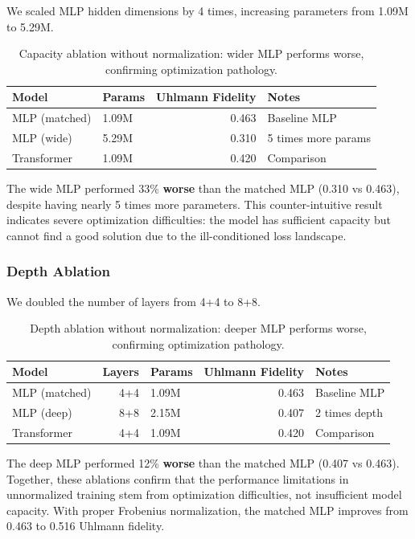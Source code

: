 \documentclass[11pt]{article}
\begin{document}
We scaled MLP hidden dimensions by 4 times, increasing parameters from 1.09M to 5.29M.

\begin{table}[htbp]
\caption{\label{tab:orgd8650ad}Capacity ablation without normalization: wider MLP performs worse, confirming optimization pathology.}
\centering
\begin{tabular}{llrl}
Model & Params & Uhlmann Fidelity & Notes\\
\hline
MLP (matched) & 1.09M & 0.463 & Baseline MLP\\
MLP (wide) & 5.29M & 0.310 & 5 times more params\\
Transformer & 1.09M & 0.420 & Comparison\\
\end{tabular}
\end{table}

The wide MLP performed 33\% \textbf{worse} than the matched MLP (0.310 vs 0.463), despite having nearly 5 times more parameters. This counter-intuitive result indicates severe optimization difficulties: the model has sufficient capacity but cannot find a good solution due to the ill-conditioned loss landscape.
\subsubsection{Depth Ablation}
\label{sec:org9bb49a6}

We doubled the number of layers from 4+4 to 8+8.

\begin{table}[htbp]
\caption{\label{tab:orgc1be02e}Depth ablation without normalization: deeper MLP performs worse, confirming optimization pathology.}
\centering
\begin{tabular}{lrlrl}
Model & Layers & Params & Uhlmann Fidelity & Notes\\
\hline
MLP (matched) & 4+4 & 1.09M & 0.463 & Baseline MLP\\
MLP (deep) & 8+8 & 2.15M & 0.407 & 2 times depth\\
Transformer & 4+4 & 1.09M & 0.420 & Comparison\\
\end{tabular}
\end{table}

The deep MLP performed 12\% \textbf{worse} than the matched MLP (0.407 vs 0.463). Together, these ablations confirm that the performance limitations in unnormalized training stem from optimization difficulties, not insufficient model capacity. With proper Frobenius normalization, the matched MLP improves from 0.463 to 0.516 Uhlmann fidelity.
\end{document}
